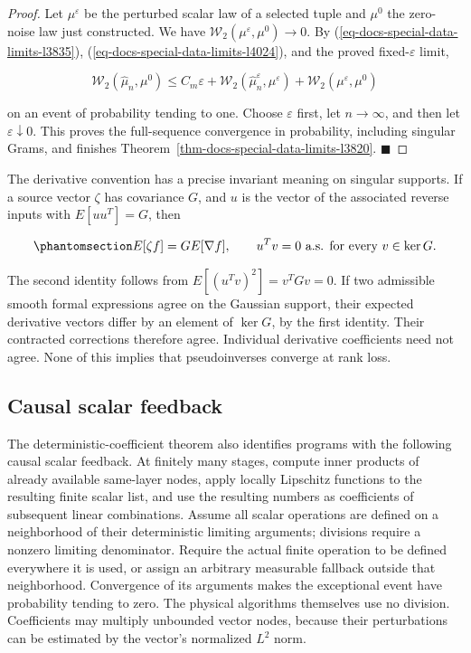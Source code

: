 \documentclass[
  11pt,
]{article}
\theoremstyle{definition}
\theoremstyle{plain}
\theoremstyle{plain}
\theoremstyle{plain}
\theoremstyle{remark}
\begin{document}
\begin{proof}
Let \(\mu^\varepsilon\) be the perturbed scalar law of a selected tuple
and \(\mu^0\) the zero-noise law just constructed. We have
\(\mathcal W_2(\mu^\varepsilon,\mu^0)\to0\). By
(\ref{eq-docs-special-data-limits-l3835}),
(\ref{eq-docs-special-data-limits-l4024}), and the proved
fixed-\(\varepsilon\) limit,

\[
\mathcal W_2(\widehat\mu_n,\mu^0)
\le C_m\varepsilon
 +\mathcal W_2(\widehat\mu_n^\varepsilon,\mu^\varepsilon)
 +\mathcal W_2(\mu^\varepsilon,\mu^0)
\]

on an event of probability tending to one. Choose \(\varepsilon\) first,
let \(n\to\infty\), and then let \(\varepsilon\downarrow0\). This proves
the full-sequence convergence in probability, including singular Grams,
and finishes Theorem~\ref{thm-docs-special-data-limits-l3820}.
\(\blacksquare\)
\end{proof}

The derivative convention has a precise invariant meaning on singular
supports. If a source vector \(\zeta\) has covariance \(G\), and \(u\)
is the vector of the associated reverse inputs with \(E[uu^T]=G\), then

\begin{equation}\protect\phantomsection\label{eq-docs-special-data-limits-l4047}{
E[\zeta f]=G E[\nabla f],\qquad
u^Tv=0\text{ a.s. for every }v\in\ker G.
}\end{equation}

The second identity follows from \(E[(u^Tv)^2]=v^TGv=0\). If two
admissible smooth formal expressions agree on the Gaussian support,
their expected derivative vectors differ by an element of \(\ker G\), by
the first identity. Their contracted corrections therefore agree.
Individual derivative coefficients need not agree. None of this implies
that pseudoinverses converge at rank loss.

\subsection{Causal scalar
feedback}\label{sec-docs-special-data-limits-l4054}

The deterministic-coefficient theorem also identifies programs with the
following causal scalar feedback. At finitely many stages, compute inner
products of already available same-layer nodes, apply locally Lipschitz
functions to the resulting finite scalar list, and use the resulting
numbers as coefficients of subsequent linear combinations. Assume all
scalar operations are defined on a neighborhood of their deterministic
limiting arguments; divisions require a nonzero limiting denominator.
Require the actual finite operation to be defined everywhere it is used,
or assign an arbitrary measurable fallback outside that neighborhood.
Convergence of its arguments makes the exceptional event have
probability tending to zero. The physical algorithms themselves use no
division. Coefficients may multiply unbounded vector nodes, because
their perturbations can be estimated by the vector's normalized \(L^2\)
norm.
\end{document}
